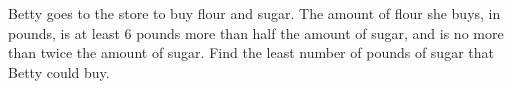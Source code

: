 Betty goes to the store to buy flour and sugar. The amount of flour she buys, in pounds, is at least $6$ pounds more than half the amount of sugar, and is no more than twice the amount of sugar. Find the least number of pounds of sugar that Betty could buy.
